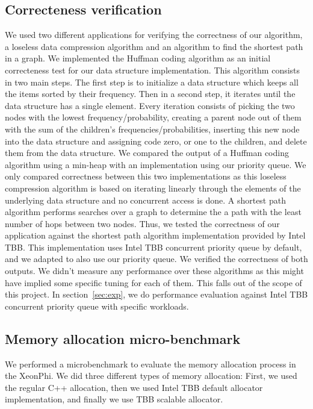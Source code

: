 \subsection{Correcteness verification}
\label{subsec:corr_ver}
We used two different applications for verifying the correctness of our algorithm, a loseless data compression algorithm and an algorithm to find the shortest path in a graph. 
We implemented the Huffman coding algorithm as an initial correcteness test for our data structure implementation. This algorithm consists in two main steps. The first step is to initialize a data structure which keeps all the items sorted by their frequency. Then in a second step, it iterates until the data structure has a single element. Every iteration consists of picking the two nodes with the lowest frequency/probability, creating a parent node out of them with the sum of the children's frequencies/probabilities, inserting this new node into the data structure and assigning code zero, or one to the children, and delete them from the data structure. We compared the output of a Huffman coding algorithm using a min-heap with an implementation using our priority queue. We only compared correctness between this two implementations as this loseless compression algorithm is based on iterating linearly through the elements of the underlying data structure and no concurrent access is done.
A shortest path algorithm performs searches over a graph to determine the a path with the least number of hops between two nodes. Thus, we tested the correctness of our application against the shortest path algorithm implementation provided by Intel TBB. This implementation uses Intel TBB concurrent priority queue by default, and we adapted to also use our priority queue. We verified the correctness of both outputs. We didn't measure any performance over these algorithms as this might have implied some specific tuning for each of them. This falls out of the scope of this project. In section~\ref{sec:exp}, we do performance evaluation against Intel TBB concurrent priority queue with specific workloads.

\subsection{Memory allocation micro-benchmark}
We performed a microbenchmark to evaluate the memory allocation process in the XeonPhi. We did three different types of memory allocation: First, we used the regular C++ allocation, then we used Intel TBB default allocator implementation, and finally we use TBB scalable allocator. 


